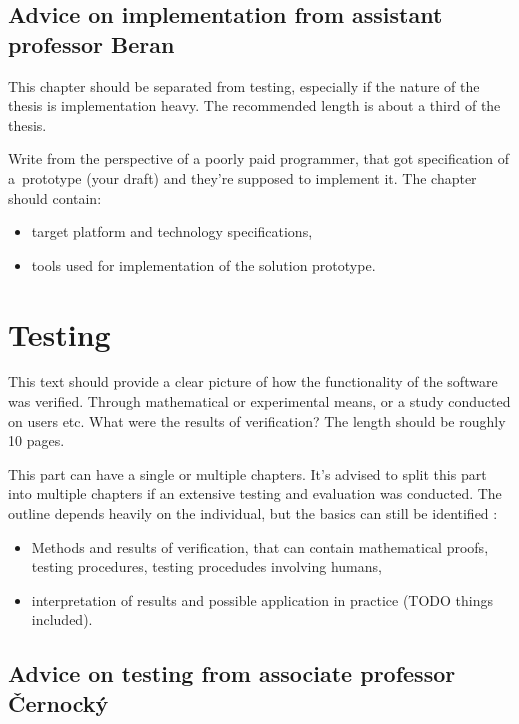 {{\subsection*{Advice on implementation from assistant professor Beran}

This chapter should be separated from testing, especially if the nature of the thesis is implementation heavy. The recommended length is about a third of the thesis.

Write from the perspective of a poorly paid programmer, that got specification of a~prototype (your draft) and they're supposed to implement it. The chapter should contain:
\begin{itemize}
  \item{target platform and technology specifications,}
  \item{tools used for implementation of the solution prototype.}
\end{itemize}


\section{Testing}
\label{testovani}

This text should provide a clear picture of how the functionality of the software was verified. Through mathematical or experimental means, or a study conducted on users etc. What were the results of verification? The length should be roughly 10 pages.

This part can have a single or multiple chapters. It's advised to split this part into multiple chapters if an extensive testing and evaluation was conducted. The outline depends heavily on the individual, but the basics can still be identified \cite{Zemcik}:
\begin{itemize}
  \item{Methods and results of verification, that can contain mathematical proofs, testing procedures, testing procedudes involving humans,}
  \item{interpretation of results and possible application in practice (TODO things included).}
\end{itemize}

\subsection*{Advice on testing from associate professor Černocký}

}}
